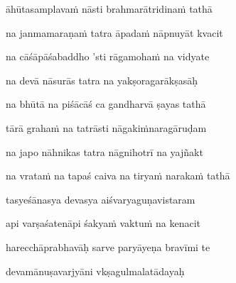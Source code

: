 āhūtasamplavaṁ nāsti brahmarātridinaṁ tathā\thinspace{\dandab} \dontdisplaylinenum

na janmamaraṇaṁ tatra āpadaṁ nāpnuyāt kvacit \veg\dontdisplaylinenum
{}

na cāśāpāśabaddho 'sti rāgamohaṁ na vidyate\thinspace{\dandab} \dontdisplaylinenum

na devā nāsurās tatra na yakṣoragarākṣasāḥ \veg\dontdisplaylinenum
{}

na bhūtā na piśācāś ca gandharvā ṣayas tathā\thinspace{\dandab} \dontdisplaylinenum

tārā grahaṁ na tatrāsti nāgakiṁnaragāruḍam \veg\dontdisplaylinenum
{}

na japo nāhnikas tatra nāgnihotrī na yajñakt\thinspace{\dandab} \dontdisplaylinenum

na vrataṁ na tapaś caiva na tiryaṁ narakaṁ tathā \veg\dontdisplaylinenum

tasyeśānasya devasya aiśvaryaguṇavistaram\thinspace{\dandab} \dontdisplaylinenum

api varṣaśatenāpi śakyaṁ vaktuṁ na kenacit \veg\dontdisplaylinenum

harecchāprabhavāḥ sarve paryāyeṇa bravīmi te\thinspace{\dandab} \dontdisplaylinenum

devamānuṣavarjyāni vkṣagulmalatādayaḥ \veg\dontdisplaylinenum
{}

